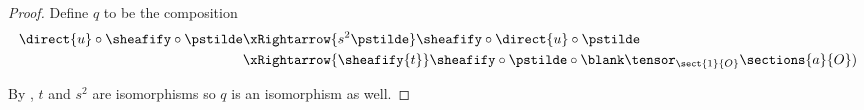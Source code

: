 
\begin{proof}
Define $q$ to be the composition
\begin{align*}
	\direct{u} \circ \sheafify \circ \pstilde 
	& \xRightarrow{s^2\pstilde} \sheafify \circ \direct{u} \circ \pstilde\\
	& \xRightarrow{\sheafify{t}} \sheafify \circ \pstilde \circ \blank \tensor_{\sect{1}{O}} \sections{a}{O})
\end{align*}

By , $t$ and $s^2$ are isomorphisms so $q$ is an isomorphism as well.
\end{proof}
